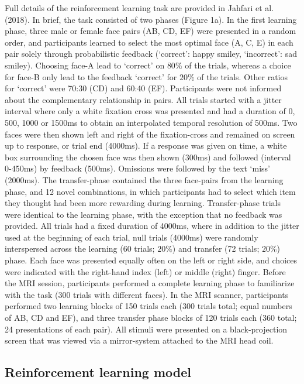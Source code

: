 \documentclass[]{article}
\begin{document}
Full details of the reinforcement learning task are provided in Jahfari
et al. (2018). In brief, the task consisted of two phases (Figure 1a).
In the first learning phase, three male or female face pairs (AB, CD,
EF) were presented in a random order, and participants learned to select
the most optimal face (A, C, E) in each pair solely through
probabilistic feedback (`correct': happy smiley, `incorrect': sad
smiley). Choosing face-A lead to `correct' on \(80\%\) of the trials,
whereas a choice for face-B only lead to the feedback `correct' for
\(20\%\) of the trials. Other ratios for `correct' were 70:30 (CD) and
60:40 (EF). Participants were not informed about the complementary
relationship in pairs. All trials started with a jitter interval where
only a white fixation cross was presented and had a duration of 0, 500,
1000 or 1500ms to obtain an interpolated temporal resolution of 500ms.
Two faces were then shown left and right of the fixation-cross and
remained on screen up to response, or trial end (4000ms). If a response
was given on time, a white box surrounding the chosen face was then
shown (300ms) and followed (interval 0-450ms) by feedback (500ms).
Omissions were followed by the text `miss' (2000ms). The transfer-phase
contained the three face-pairs from the learning phase, and 12 novel
combinations, in which participants had to select which item they
thought had been more rewarding during learning. Transfer-phase trials
were identical to the learning phase, with the exception that no
feedback was provided. All trials had a fixed duration of 4000ms, where
in addition to the jitter used at the beginning of each trial, null
trials (4000ms) were randomly interspersed across the learning (60
trials; \(20\%\)) and transfer (72 trials; \(20\%\)) phase. Each face
was presented equally often on the left or right side, and choices were
indicated with the right-hand index (left) or middle (right) finger.
Before the MRI session, participants performed a complete learning phase
to familiarize with the task (300 trials with different faces). In the
MRI scanner, participants performed two learning blocks of 150 trials
each (300 trials total; equal numbers of AB, CD and EF), and three
transfer phase blocks of 120 trials each (360 total; 24 presentations of
each pair). All stimuli were presented on a black-projection screen that
was viewed via a mirror-system attached to the MRI head coil.

\hypertarget{reinforcement-learning-model}{%
\subsection{Reinforcement learning
model}\label{reinforcement-learning-model}}
\end{document}
